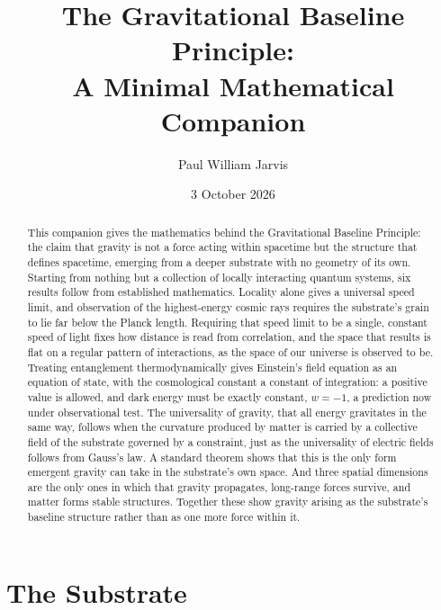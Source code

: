 \documentclass[aps,prd,onecolumn,nofootinbib,superscriptaddress]{revtex4-2}
\begin{document}
\title{The Gravitational Baseline Principle:\\ A Minimal Mathematical Companion}

\author{Paul William Jarvis}

\date{3 October 2026}

\begin{abstract}
This companion gives the mathematics behind the Gravitational Baseline Principle: the claim that gravity is not a force acting within spacetime but the structure that defines spacetime, emerging from a deeper substrate with no geometry of its own. Starting from nothing but a collection of locally interacting quantum systems, six results follow from established mathematics. Locality alone gives a universal speed limit, and observation of the highest-energy cosmic rays requires the substrate's grain to lie far below the Planck length. Requiring that speed limit to be a single, constant speed of light fixes how distance is read from correlation, and the space that results is flat on a regular pattern of interactions, as the space of our universe is observed to be. Treating entanglement thermodynamically gives Einstein's field equation as an equation of state, with the cosmological constant a constant of integration: a positive value is allowed, and dark energy must be exactly constant, $w=-1$, a prediction now under observational test. The universality of gravity, that all energy gravitates in the same way, follows when the curvature produced by matter is carried by a collective field of the substrate governed by a constraint, just as the universality of electric fields follows from Gauss's law. A standard theorem shows that this is the only form emergent gravity can take in the substrate's own space. And three spatial dimensions are the only ones in which that gravity propagates, long-range forces survive, and matter forms stable structures. Together these show gravity arising as the substrate's baseline structure rather than as one more force within it.
\end{abstract}

\maketitle

\section{The Substrate}
\label{sec:substrate}
\end{document}
